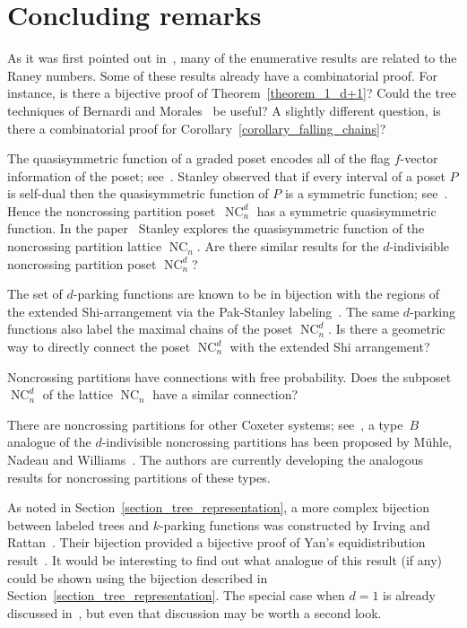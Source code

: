 \documentclass[11pt]{amsart}
\numberwithin{equation}{section}
\DeclareMathOperator{\NC}{NC}
\begin{document}
\section{Concluding remarks}
\label{section_Concluding_remarks}

As it was first pointed out
in~\cite{Muhle_Nadeau_Williams}, many of the enumerative results are
related to the Raney numbers.
Some of these results already have a combinatorial proof.
For instance, is there a bijective proof of Theorem~\ref{theorem_1_d+1}?
Could the tree techniques of Bernardi and Morales~\cite{Bernardi_Morales}
be useful?
A slightly different question, 
is there a combinatorial proof for 
Corollary~\ref{corollary_falling_chains}? 


The quasisymmetric function of a graded poset
encodes all of the flag $f$-vector information of the poset;
see~\cite{Ehrenborg}.
Stanley observed that if every interval of a poset $P$
is self-dual then the quasisymmetric function of $P$
is a symmetric function; see~\cite[Theorem~1.4]{Stanley_Flag}.
Hence the noncrossing partition poset~$\NC^{d}_{n}$
has a symmetric quasisymmetric function.
In the paper~\cite{Stanley}
Stanley explores the quasisymmetric function
of the noncrossing partition lattice $\NC_{n}$.
Are there similar results for the $d$-indivisible noncrossing partition
poset $\NC^{d}_{n}$? 

The set of $d$-parking functions are known to be in bijection with
the regions of the extended Shi-arrangement via the Pak-Stanley
labeling~\cite[Theorem~2.1]{Stanley_Flag}. The same
$d$-parking functions also label the maximal chains of the poset
$\NC^{d}_{n}$. Is there a geometric way to directly connect the poset
$\NC^{d}_{n}$ with the extended Shi arrangement?

Noncrossing partitions have connections with free probability.
Does the subposet $\NC^{d}_{n}$ of the lattice $\NC_{n}$ have a similar
connection? 

There are noncrossing partitions for other Coxeter systems;
see~\cite{Armstrong,Reiner}, a type~$B$ analogue of the $d$-indivisible
noncrossing partitions has been proposed by M\"uhle, Nadeau and
Williams~\cite{Muhle_Nadeau_Williams}.  
The authors are currently developing the analogous results for
noncrossing partitions of these types.

As noted in Section~\ref{section_tree_representation}, a more complex
bijection between labeled trees and $k$-parking functions was constructed by
Irving and Rattan~\cite{Irving_Rattan}. Their bijection provided a
bijective proof of Yan's equidistribution
result~\cite{Yan}. It would be interesting to
find out what analogue of this result (if any) could be shown using the
bijection described in Section~\ref{section_tree_representation}. The
special case when $d=1$ is already discussed in~\cite[Section~13.2.3]{Yan_chapter},
but even that discussion may be worth a second look. 
\end{document}
